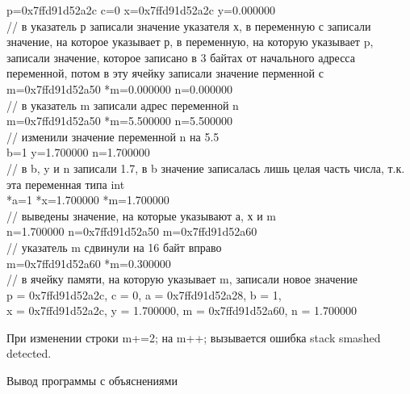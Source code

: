 \documentclass[a4paper,14pt]{extarticle}
\begin{document}
\begin{footnotesize}
p=0x7ffd91d52a2c	c=0	x=0x7ffd91d52a2c	y=0.000000\\
// в указатель р записали значение указателя х, в переменную с записали значение, на которое указывает р, в переменную, на которую указывает p, записали значение, которое записано в 3 байтах от начального адресса переменной, потом в эту ячейку записали значение перменной с\\
m=0x7ffd91d52a50	*m=0.000000	n=0.000000\\
// в указатель m записали адрес переменной n\\
m=0x7ffd91d52a50	*m=5.500000	n=5.500000\\
// изменили значение переменной n на 5.5\\
b=1	y=1.700000	n=1.700000\\
// в b, y и n записали 1.7, в b значение записалась лишь целая часть числа, т.к. эта переменная типа int\\
*a=1	*x=1.700000	*m=1.700000\\
// выведены значение, на которые указывают а, х и m\\
n=1.700000	n=0x7ffd91d52a50	m=0x7ffd91d52a60\\
// указатель m сдвинули на 16 байт вправо\\
m=0x7ffd91d52a60	*m=0.300000\\
// в ячейку памяти, на которую указывает m, записали новое значение\\
p = 0x7ffd91d52a2c, c = 0, a = 0x7ffd91d52a28, b = 1,\\
x = 0x7ffd91d52a2c, y = 1.700000, m = 0x7ffd91d52a60, n = 1.700000\\
\end{footnotesize}
При изменении строки m+=2; на m++; вызывается ошибка stack smashed detected.

\begin{center}
{\small Вывод программы с объяснениями}
\end{center}
\end{document}
